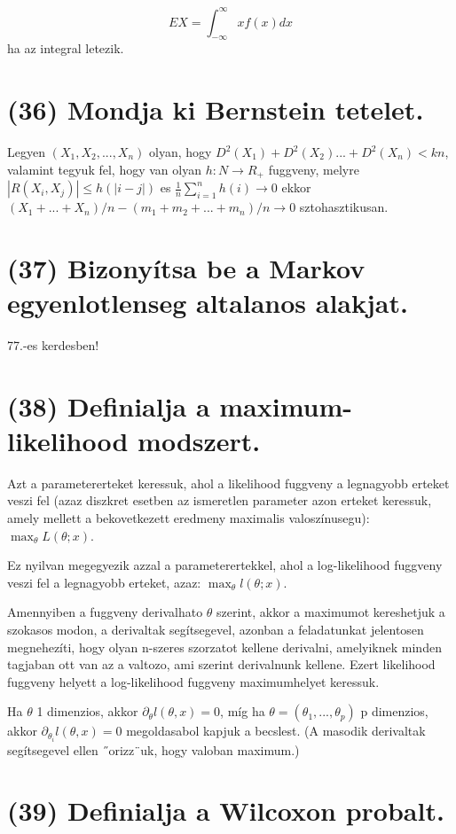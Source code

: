 \documentclass[12p]{article}
\begin{document}
$$EX = \int_{-\infty}^{\infty} x f(x) dx$$
ha az integral letezik.

\section{(36) Mondja ki Bernstein tetelet.}

Legyen $(X_1, X_2, ..., X_n)$ olyan, hogy $D^2(X_1) + D^2(X_2) ... + D^2(X_n) < kn$, valamint tegyuk fel, hogy van olyan $h: N \rightarrow R_{+}$ fuggveny, melyre $|R(X_i, X_j)| \leq h(|i-j|)$ es $\frac{1}{n} \displaystyle{\sum^n_{i=1}} h(i) \rightarrow 0$ ekkor $(X_1 + ... + X_n) / n - (m_1 + m_2 + ... + m_n)/n \rightarrow 0$ sztohasztikusan.

\section{(37) Bizonyítsa be a Markov egyenlotlenseg altalanos alakjat.}

77.-es kerdesben!

\section{(38) Definialja a maximum-likelihood modszert.}

Azt a parametererteket keressuk, ahol a likelihood fuggveny a legnagyobb erteket veszi fel (azaz diszkret esetben az
ismeretlen parameter azon erteket keressuk, amely mellett a bekovetkezett eredmeny maximalis valoszínusegu): $\max_{\theta}L(\theta; x)$.

Ez nyilvan megegyezik azzal a parameterertekkel, ahol a log-likelihood fuggveny veszi fel a legnagyobb
erteket, azaz: $\max_{\theta} l(\theta; x)$.

Amennyiben a fuggveny derivalhato $\theta$ szerint, akkor a maximumot kereshetjuk a szokasos modon, a derivaltak
segítsegevel, azonban a feladatunkat jelentosen megnehezíti, hogy olyan n-szeres szorzatot kellene derivalni, amelyiknek minden tagjaban ott van az a valtozo, ami szerint derivalnunk kellene. Ezert likelihood fuggveny helyett a log-likelihood fuggveny maximumhelyet keressuk.

Ha $\theta$ 1 dimenzios, akkor $\partial_\theta l(\theta, x) = 0$, míg ha $\theta = (\theta_1, ..., \theta_p)$ p dimenzios, akkor $\partial_{\theta_i} l(\theta, x) = 0$ megoldasabol
kapjuk a becslest. (A masodik derivaltak segítsegevel ellen ˝orizz¨uk, hogy valoban maximum.)


\section{(39) Definialja a Wilcoxon probalt.}
\end{document}

